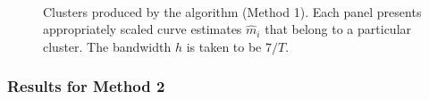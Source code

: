 \documentclass[a4paper,12pt]{article}
\numberwithin{equation}{section}
\begin{document}
\begin{figure}
\\
\hspace{0.25cm}
\caption{Clusters produced by the algorithm (Method 1). Each panel presents appropriately scaled curve estimates $\hat{m}_i$ that belong to a particular cluster. The bandwidth $h$ is taken to be $7/T$.}\label{fig:clusters_14days}
\vspace{1cm}

\end{figure}


\FloatBarrier 


\subsubsection{Results for Method 2}
\end{document}
